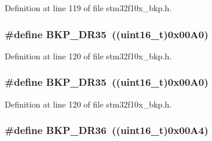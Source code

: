 Definition at line 119 of file stm32f10x\+\_\+bkp.\+h.

\subsubsection[{\texorpdfstring{B\+K\+P\+\_\+\+D\+R35}{BKP_DR35}}]{\setlength{\rightskip}{0pt plus 5cm}\#define B\+K\+P\+\_\+\+D\+R35~(({\bf uint16\+\_\+t})0x00\+A0)}\hypertarget{group___data___backup___register_ga54e494fd651d2e1970ab7e5d6528af21}{}\label{group___data___backup___register_ga54e494fd651d2e1970ab7e5d6528af21}


Definition at line 120 of file stm32f10x\+\_\+bkp.\+h.

\subsubsection[{\texorpdfstring{B\+K\+P\+\_\+\+D\+R35}{BKP_DR35}}]{\setlength{\rightskip}{0pt plus 5cm}\#define B\+K\+P\+\_\+\+D\+R35~(({\bf uint16\+\_\+t})0x00\+A0)}\hypertarget{group___data___backup___register_ga54e494fd651d2e1970ab7e5d6528af21}{}\label{group___data___backup___register_ga54e494fd651d2e1970ab7e5d6528af21}


Definition at line 120 of file stm32f10x\+\_\+bkp.\+h.

\subsubsection[{\texorpdfstring{B\+K\+P\+\_\+\+D\+R36}{BKP_DR36}}]{\setlength{\rightskip}{0pt plus 5cm}\#define B\+K\+P\+\_\+\+D\+R36~(({\bf uint16\+\_\+t})0x00\+A4)}\hypertarget{group___data___backup___register_ga212028eb8d981756b3bc78492434d19a}{}\label{group___data___backup___register_ga212028eb8d981756b3bc78492434d19a}


